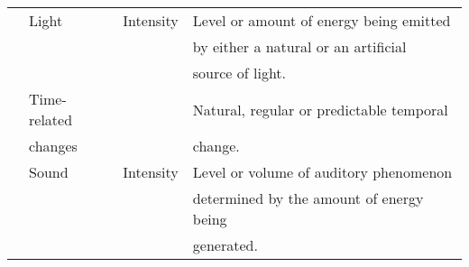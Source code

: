 \begin{table}
\begin{tabular}{l l l l}
		& Light			& Intensity	& Level or amount of energy being emitted\\
		& 			& 		& by either a natural or an artificial 	\\
		& 			& 		& source of light.			\\
		& Time-related 		& 		& Natural, regular or predictable temporal\\
		& changes		& 		& change.				\\
		& Sound			& Intensity	& Level or volume of auditory phenomenon\\
		& 			& 		& determined by the amount of energy being\\
		& 			& 		& generated.\\
    \hline
  \end{tabular}
\end{table}




% 
